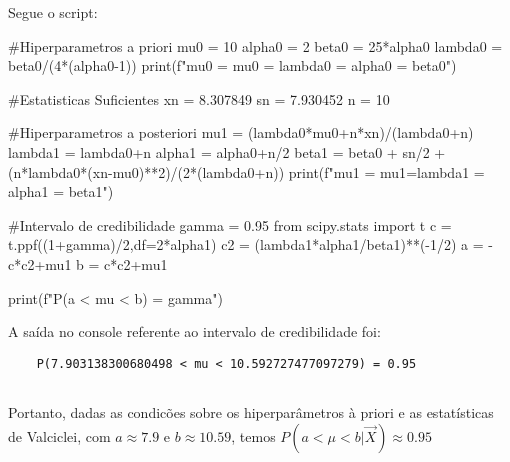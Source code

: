 \documentclass[a4paper]{article}
\newcommand{\vX}{\vec X}
\begin{document}
Segue o script:

\begin{python}
	#Hiperparametros a priori
	mu0 = 10
	alpha0 = 2
	beta0 = 25*alpha0
	lambda0 = beta0/(4*(alpha0-1))
	print(f"mu0 = {mu0} = {lambda0} = {alpha0} = {beta0}\n\n")
	
	#Estatisticas Suficientes
	xn = 8.307849
	sn = 7.930452
	n = 10
	
	#Hiperparametros a posteriori
	mu1 = (lambda0*mu0+n*xn)/(lambda0+n)
	lambda1 = lambda0+n
	alpha1 = alpha0+n/2
	beta1 = beta0 + sn/2 + (n*lambda0*(xn-mu0)**2)/(2*(lambda0+n))
	print(f"mu1 = {mu1}={lambda1} = {alpha1} = {beta1}\n\n")
	
	#Intervalo de credibilidade
	gamma = 0.95
	from scipy.stats import t
	c = t.ppf((1+gamma)/2,df=2*alpha1)
	c2 = (lambda1*alpha1/beta1)**(-1/2)
	a = -c*c2+mu1
	b = c*c2+mu1
	
	print(f"P({a} < mu < {b}) = {gamma}")
	
\end{python}

A saída no console referente ao intervalo de credibilidade foi:

\begin{lstlisting}
	P(7.903138300680498 < mu < 10.592727477097279) = 0.95
	
\end{lstlisting}

Portanto, dadas as condicões sobre os hiperparâmetros à priori e as estatísticas de Valciclei, com $a\approx 7.9$ e $b\approx 10.59$, temos $P(a < \mu < b|\vX) \approx 0.95$



\newpage


\end{document}
